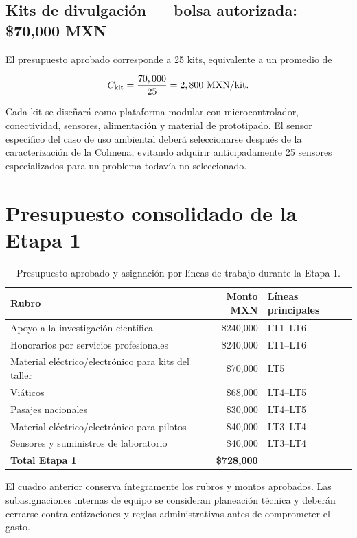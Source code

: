 \subsection{Kits de divulgación --- bolsa autorizada: \$70,000 MXN}

El presupuesto aprobado corresponde a 25 kits, equivalente a un promedio de

\begin{equation}
\bar C_{\rm kit}=
\frac{70,000}{25}=2,800\ {\rm MXN/kit}.
\end{equation}

Cada kit se diseñará como plataforma modular con microcontrolador, conectividad,
sensores, alimentación y material de prototipado. El sensor específico del caso de uso
ambiental deberá seleccionarse después de la caracterización de la Colmena, evitando
adquirir anticipadamente 25 sensores especializados para un problema todavía no
seleccionado.

\section{Presupuesto consolidado de la Etapa 1}

\begin{table}[H]
\centering
\caption{Presupuesto aprobado y asignación por líneas de trabajo durante la Etapa 1.}
\label{tab:stage1_budget_formal}
\small
\begin{tabularx}{\textwidth}{L r P{2.1cm}}
\toprule
\textbf{Rubro} & \textbf{Monto MXN} & \textbf{Líneas principales}\\
\midrule
Apoyo a la investigación científica
& \$240,000 & LT1--LT6\\
Honorarios por servicios profesionales
& \$240,000 & LT1--LT6\\
Material eléctrico/electrónico para kits del taller
& \$70,000 & LT5\\
Viáticos
& \$68,000 & LT4--LT5\\
Pasajes nacionales
& \$30,000 & LT4--LT5\\
Material eléctrico/electrónico para pilotos
& \$40,000 & LT3--LT4\\
Sensores y suministros de laboratorio
& \$40,000 & LT3--LT4\\
\midrule
\textbf{Total Etapa 1}
& \textbf{\$728,000}
& \\
\bottomrule
\end{tabularx}
\end{table}

El cuadro anterior conserva íntegramente los rubros y montos aprobados. Las
subasignaciones internas de equipo se consideran planeación técnica y deberán cerrarse
contra cotizaciones y reglas administrativas antes de comprometer el gasto.

